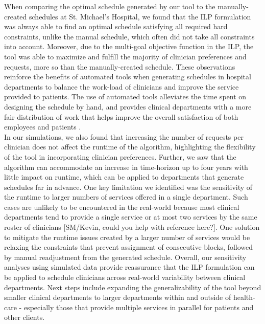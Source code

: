 When comparing the optimal schedule generated by our tool to the
manually-created schedules at St. Michael's Hospital, we found that the ILP
formulation was always able to find an optimal schedule satisfying all required
hard constraints, unlike the manual schedule, which often did not take all
constraints into account. Moreover, due to the multi-goal objective function in
the ILP, the tool was able to maximize and fulfill the majority of clinician
preferences and requests, more so than the manually-created schedule. These
observations reinforce the benefits of automated tools when generating schedules
in hospital departments to balance the work-load of clinicians and improve the
service provided to patients. The use of automated tools alleviates the time
spent on designing the schedule by hand, and provides clinical departments with
a more fair distribution of work that helps improve the overall satisfaction of
both employees and patients \cite{silvestro_evaluation_2000}. \\  %

In our simulations, we also found that increasing the number of requests per
clinician does not affect the runtime of the algorithm, highlighting the
flexibility of the tool in incorporating clinician preferences. Further, we saw
that the algorithm can accommodate an increase in time-horizon up to four years
with little impact on runtime, which can be applied to departments that generate
schedules far in advance. One key limitation we identified was the sensitivity
of the runtime to larger numbers of services offered in a single department.
Such cases are unlikely to be encountered in the real-world because most
clinical departments tend to provide a single service or at most two services by
the same roster of clinicians [{\color{red}SM/Kevin, could you help with
	reference here?}]. One solution to mitigate the runtime issues created by a
larger number of services would be relaxing the constraints that prevent
assignment of consecutive blocks, followed by manual readjustment from the
generated schedule. %
Overall, our sensitivity analyses using simulated data provide reassurance that
the ILP formulation can be applied to schedule clinicians across real-world
variability between clinical departments. %
Next steps include expanding the generalizability of the tool beyond smaller
clinical departments to larger departments within and outside of health-care -
especially those that provide multiple services in parallel for patients and
other clients. 
